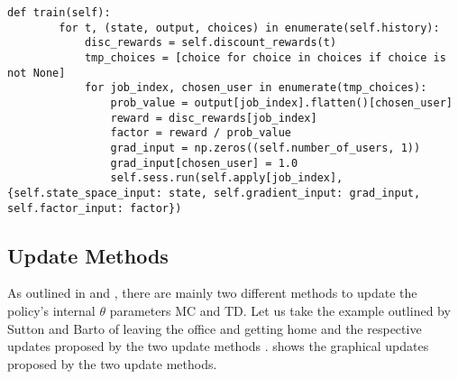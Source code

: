 \documentclass{seal_thesis}
\begin{document}
\begin{lstlisting}[caption=Backpropagation algorithm following a MC update approach,label=lst:mc_backpropagation,style=CustomPython]
    def train(self):
        for t, (state, output, choices) in enumerate(self.history):
            disc_rewards = self.discount_rewards(t)
            tmp_choices = [choice for choice in choices if choice is not None]
            for job_index, chosen_user in enumerate(tmp_choices):
                prob_value = output[job_index].flatten()[chosen_user]
                reward = disc_rewards[job_index]
                factor = reward / prob_value
                grad_input = np.zeros((self.number_of_users, 1))
                grad_input[chosen_user] = 1.0
                self.sess.run(self.apply[job_index], {self.state_space_input: state, self.gradient_input: grad_input, self.factor_input: factor})
\end{lstlisting}

\subsection{Update Methods}
\label{subsec:update_methods}

As outlined in  and , there are mainly two different methods to update the policy's internal $\theta$ parameters \ie MC and TD. Let us take the example outlined by Sutton and Barto of leaving the office and getting home and the respective updates proposed by the two update methods \cite[p. 130]{Sutton2017}.  shows the graphical updates proposed by the two update methods.

\end{document}
